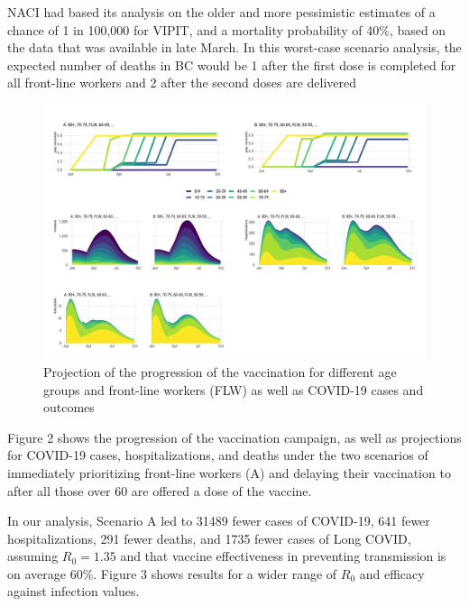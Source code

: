 \documentclass[]{interact}
\theoremstyle{plain}%
\theoremstyle{definition}
\theoremstyle{remark}
\begin{document}
NACI had based its analysis on the older and more pessimistic estimates
of a chance of 1 in 100,000 for VIPIT, and a mortality probability of
40\%, based on the data that was available in late March. In this
worst-case scenario analysis, the expected number of deaths in BC would
be 1 after the first dose is completed for all front-line workers and 2
after the second doses are delivered

\begin{figure}

{\centering \includegraphics[width=1\linewidth]{../figures/fig-trajectoriesFull} 

}

\caption{Projection of the progression of the vaccination for different age groups and front-line workers (FLW) as well as COVID-19 cases and outcomes}\label{fig:fig1}
\end{figure}

Figure 2 shows the progression of the vaccination campaign, as well as
projections for COVID-19 cases, hospitalizations, and deaths under the
two scenarios of immediately prioritizing front-line workers (A) and
delaying their vaccination to after all those over 60 are offered a dose
of the vaccine.

In our analysis, Scenario A led to 31489 fewer cases of COVID-19, 641
fewer hospitalizations, 291 fewer deaths, and 1735 fewer cases of Long
COVID, assuming \(R_0=1.35\) and that vaccine effectiveness in
preventing transmission is on average 60\%. Figure 3 shows results for a
wider range of \(R_0\) and efficacy against infection values.
\end{document}
